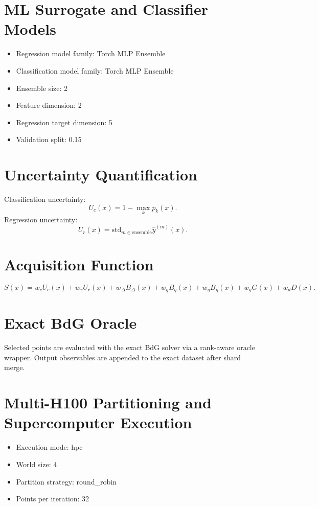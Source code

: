 \documentclass[11pt]{article}
\begin{document}
\section{ML Surrogate and Classifier Models}
\begin{itemize}
\item Regression model family: Torch MLP Ensemble
\item Classification model family: Torch MLP Ensemble
\item Ensemble size: 2
\item Feature dimension: 2
\item Regression target dimension: 5
\item Validation split: 0.15
\end{itemize}

\section{Uncertainty Quantification}
Classification uncertainty:
\[
U_c(x) = 1 - \max_k p_k(x).
\]
Regression uncertainty:
\[
U_r(x) = \mathrm{std}_{m \in \text{ensemble}} \hat{y}^{(m)}(x).
\]

\section{Acquisition Function}
\[
S(x) =
w_c U_c(x)
+ w_r U_r(x)
+ w_\Delta B_\Delta(x)
+ w_q B_q(x)
+ w_\eta B_\eta(x)
+ w_g G(x)
+ w_d D(x).
\]

\section{Exact BdG Oracle}
Selected points are evaluated with the exact BdG solver via a rank-aware oracle wrapper. Output observables are appended to the exact dataset after shard merge.

\section{Multi-H100 Partitioning and Supercomputer Execution}
\begin{itemize}
\item Execution mode: hpc
\item World size: 4
\item Partition strategy: round\_robin
\item Points per iteration: 32
\end{itemize}
\end{document}
